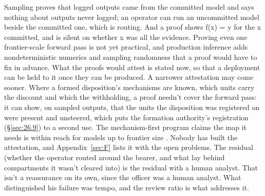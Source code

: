 Sampling proves that logged outputs came from the committed model and says nothing about outputs never logged; an operator can run an uncommitted model beside the committed one, which is routing. And a proof shows f(x) = y for the x committed, and is silent on whether x was all the evidence. Proving even one frontier-scale forward pass is not yet practical, and production inference adds nondeterministic numerics and sampling randomness that a proof would have to fix in advance. What the proofs would attest is stated now, so that a deployment can be held to it once they can be produced. A narrower attestation may come sooner. Where a formed disposition's mechanisms are known, which units carry the discount and which the withholding, a proof needn't cover the forward pass: it can show, on sampled outputs, that the units the disposition was registered on were present and unsteered, which puts the formation authority's registration (\S\ref{sec:26.9}) to a second use. The mechanism-first program claims the map it needs is within reach for models up to frontier size \autocite{cammarata2026clean}. Nobody has built the attestation, and Appendix~\ref{sec:F} lists it with the open problems. The residual (whether the operator routed around the bearer, and what lay behind compartments it wasn't cleared into) is the residual with a human analyst. That isn't a reassurance on its own, since the officer was a human analyst. What distinguished his failure was tempo, and the review ratio is what addresses it.
